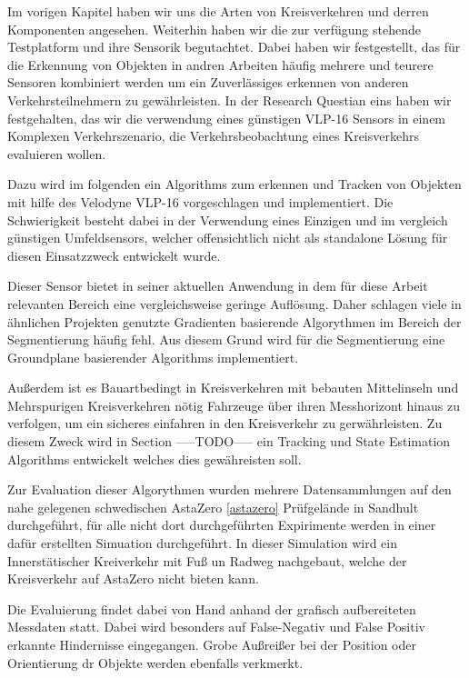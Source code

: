 \documentclass[11pt,oneside,openright]{mpreport}
\begin{document}
Im vorigen Kapitel haben wir uns die Arten von Kreisverkehren und derren Komponenten angesehen. Weiterhin haben wir die zur verfügung
stehende Testplatform und ihre Sensorik begutachtet. Dabei haben wir festgestellt, das für die Erkennung von Objekten in andren
Arbeiten häufig mehrere und teurere Sensoren kombiniert werden um ein Zuverlässiges erkennen von anderen Verkehrsteilnehmern zu gewährleisten.
In der Research Questian eins haben wir festgehalten, das wir die verwendung eines günstigen VLP-16 Sensors in einem 
Komplexen Verkehrszenario, die Verkehrsbeobachtung eines Kreisverkehrs evaluieren wollen.

Dazu wird im folgenden ein Algorithms zum erkennen und Tracken von Objekten mit hilfe des Velodyne VLP-16 vorgeschlagen
und implementiert. Die Schwierigkeit besteht dabei in der Verwendung eines Einzigen und im vergleich günstigen
Umfeldsensors, welcher offensichtlich nicht als standalone Lösung für diesen Einsatzzweck entwickelt wurde.

Dieser Sensor bietet in seiner aktuellen Anwendung in dem für diese Arbeit relevanten Bereich eine vergleichsweise
geringe Auflösung. Daher schlagen viele in ähnlichen Projekten genutzte Gradienten basierende Algorythmen im Bereich 
der Segmentierung häufig fehl. Aus diesem Grund wird für die Segmentierung eine Groundplane basierender Algorithms implementiert.

Außerdem ist es Bauartbedingt in Kreisverkehren mit bebauten Mittelinseln und Mehrspurigen Kreisverkehren nötig
Fahrzeuge über ihren Messhorizont hinaus zu verfolgen, um ein sicheres einfahren in den Kreisverkehr zu gerwährleisten.
Zu diesem Zweck wird in Section -----TODO----- ein Tracking und State Estimation Algorithms entwickelt welches dies gewähreisten soll.

Zur Evaluation dieser Algorythmen wurden mehrere Datensammlungen auf den nahe gelegenen schwedischen AstaZero \cref{astazero} Prüfgelände in Sandhult
durchgeführt, für alle nicht dort durchgeführten Expirimente werden in einer dafür erstellten Simuation durchgeführt. In dieser Simulation
wird ein Innerstätischer Kreiverkehr mit Fuß un Radweg nachgebaut, welche der Kreisverkehr auf AstaZero nicht bieten kann.

Die Evaluierung findet dabei von Hand anhand der grafisch aufbereiteten Messdaten statt. Dabei wird besonders auf False-Negativ
und False Positiv erkannte Hindernisse eingegangen. Grobe Außreißer bei der Position oder Orientierung dr Objekte werden ebenfalls verkmerkt.
\end{document}

